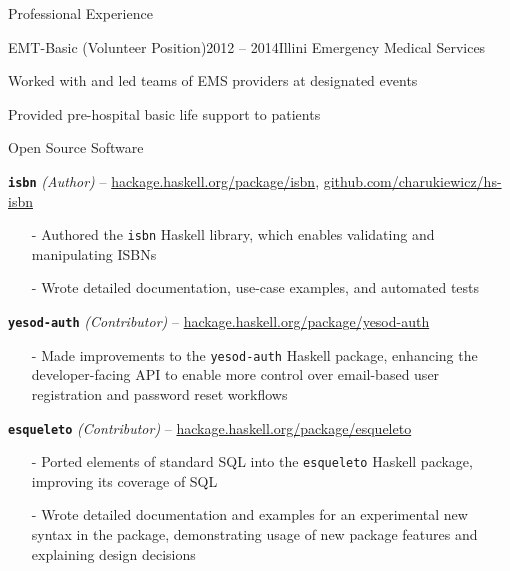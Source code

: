 \documentclass{resume} %
\begin{document}
\begin{rSection}{Professional Experience}

\begin{rSubsection}{EMT-Basic (Volunteer Position)}{2012 -- 2014}{Illini Emergency Medical Services}{}
  \item Worked with and led teams of EMS providers at designated events
  \item Provided pre-hospital basic life support to patients
\end{rSubsection}

\end{rSection}


\begin{rSection}{Open Source Software}

\begin{rListSection}
\item \textbf{\texttt{isbn}} {\em (Author)} -- \href{https://hackage.haskell.org/package/isbn}{hackage.haskell.org/package/isbn}, \href{https://github.com/charukiewicz/hs-isbn}{github.com/charukiewicz/hs-isbn}
    \begin{itemize} \itemsep -0.5em \vspace{-0.5em}
    \item[-] Authored the \texttt{isbn} Haskell library, which enables validating and manipulating ISBNs
    \item[-] Wrote detailed documentation, use-case examples, and automated tests
    \end{itemize}
\item \textbf{\texttt{yesod-auth}} {\em (Contributor)} -- \href{https://hackage.haskell.org/package/yesod-auth}{hackage.haskell.org/package/yesod-auth}
    \begin{itemize} \itemsep -0.5em \vspace{-0.5em}
    \item[-] Made improvements to the \texttt{yesod-auth} Haskell package, enhancing the developer-facing API to enable more control over email-based user registration and password reset workflows
    \end{itemize}
\item \textbf{\texttt{esqueleto}} {\em (Contributor)} -- \href{https://hackage.haskell.org/package/esqueleto}{hackage.haskell.org/package/esqueleto}
    \begin{itemize} \itemsep -0.5em \vspace{-0.5em}
    \item[-] Ported elements of standard SQL into the \texttt{esqueleto} Haskell package, improving its coverage of SQL
    \item[-] Wrote detailed documentation and examples for an experimental new syntax in the package, demonstrating usage of new package features and explaining design decisions
    \end{itemize}
\end{rListSection}

\end{rSection}
\end{document}
